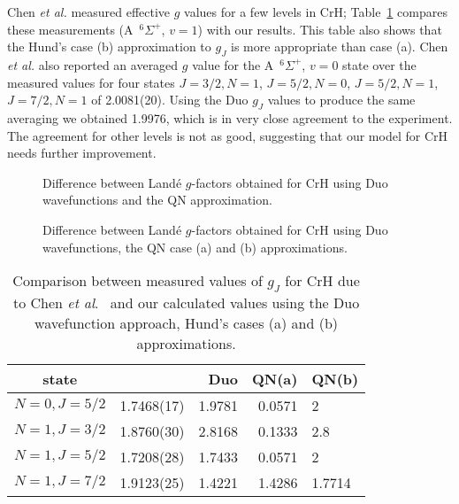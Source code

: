 \documentclass[preprint,review,12pt]{elsarticle}
\newcommand{\2}{$_{2}$}
\newcommand{\3}{$_{3}$}
\newcommand{\4}{$_{4}$}
\newcommand{\8}{$^{18}$}
\newcommand{\6}{$^{16}$}
\newcommand{\7}{$^{17}$}
\newcommand{\etal}{\emph{et al}.}
\begin{document}
Chen {\it et al.} \cite{07ChBaPe.CrH} measured effective $g$ values
for a few levels in CrH; Table~\ref{tab.CrH} compares these
measurements (A~$^{6}\Sigma^+$, $v=1$) with our results.
This table also shows that the Hund's  case (b) approximation to $g_J$ is more appropriate than
case (a). Chen {\it et al.}  \cite{07ChBaPe.CrH}  also reported an averaged $g$ value for
the A~$^{6}\Sigma^+$, $v=0$ state over the measured values for four
states $J=3/2, N=1$, $J=5/2, N=0$, $J=5/2, N=1$, $J=7/2, N=1$ of
  2.0081(20). Using the Duo $g_J$ values to produce the same averaging
  we obtained 1.9976, which is in very close agreement to the
  experiment. The agreement for other levels is not as good, suggesting
that our model for CrH needs further improvement.

\begin{figure}[htbp]
		\centering
{}
\caption{Difference between Land\'e $g$-factors obtained for CrH using {\sc Duo} wavefunctions and the QN
approximation.}
\label{fig:CrH}
\end{figure}


\begin{figure}[htbp]
		\centering
{}
\caption{Difference between Land\'e $g$-factors obtained for CrH using {\sc Duo} wavefunctions, the QN case (a) and
(b) approximations.}
\label{f:CrH:A:B:Duo}
\end{figure}



\begin{table}
\caption{Comparison between measured values
of  $g_J$ for CrH due to Chen \etal\ \cite{07ChBaPe.CrH} and our calculated values using the Duo
wavefunction approach, Hund's cases (a) and (b) approximations. }
		\begin{center}
			\begin{tabular}{crrrl}
				\hline\hline
state &  \citep{07ChBaPe.CrH}  & Duo &  QN(a) & QN(b) \\
\hline
$N=0, J=5/2$	&	1.7468(17)	&	1.9781	&0.0571	&	2	\\
$N=1, J=3/2$	&	1.8760(30)	&	2.8168	&0.1333	&	2.8	\\
$N=1, J=5/2$	&	1.7208(28)	&	1.7433	&0.0571	&	2	\\
$N=1, J=7/2$	&	1.9123(25)	&	1.4221	&1.4286	&	1.7714	\\
\hline\hline
\end{tabular} \label{tab.CrH}
\end{center}
\end{table}
\end{document}
